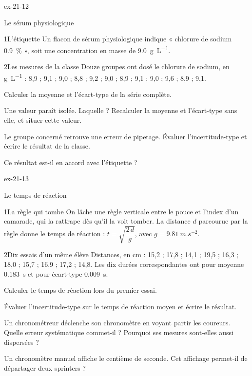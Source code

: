 \begin{blocLivre}{ex-21-12}
\begin{exercice}[3]{Le sérum physiologique}
\begin{docu}{1}{L'étiquette}
Un flacon de sérum physiologique indique « chlorure de sodium \qty{0,9}{\percent} », soit une concentration en masse de \qty{9,0}{g.L^{-1}}.
\end{docu}
\begin{docu}{2}{Les mesures de la classe}
Douze groupes ont dosé le chlorure de sodium, en \unit{g.L^{-1}} : 8,9 ; 9,1 ; 9,0 ; 8,8 ; 9,2 ; 9,0 ; 8,9 ; 9,1 ; 9,0 ; 9,6 ; 8,9 ; 9,1.
\end{docu}
\begin{questions}
\item Calculer la moyenne et l'écart-type de la série complète.
\item Une valeur paraît isolée. Laquelle ? Recalculer la moyenne et l'écart-type sans elle, et situer cette valeur.
\item \initiative Le groupe concerné retrouve une erreur de pipetage. Évaluer l'incertitude-type et écrire le résultat de la classe.
\item Ce résultat est-il en accord avec l'étiquette ?
\end{questions}
\end{exercice}
\end{blocLivre}
\begin{blocLivre}{ex-21-13}
\begin{exercice}[3]{Le temps de réaction}
\begin{docu}{1}{La règle qui tombe}
On lâche une règle verticale entre le pouce et l'index d'un camarade, qui la rattrape dès qu'il la voit tomber. La distance $d$
parcourue par la règle donne le temps de réaction : $t=\sqrt{\dfrac{2\,d}{g}}$, avec $g=\qty{9,81}{m.s^{-2}}$.
\end{docu}
\begin{docu}{2}{Dix essais d'un même élève}
Distances, en cm : 15,2 ; 17,8 ; 14,1 ; 19,5 ; 16,3 ; 18,0 ; 15,7 ; 16,9 ; 17,2 ; 14,8. Les dix durées correspondantes ont pour moyenne
\qty{0,183}{s} et pour écart-type \qty{0,009}{s}.
\end{docu}
\begin{questions}
\item Calculer le temps de réaction lors du premier essai.
\item Évaluer l'incertitude-type sur le temps de réaction moyen et écrire le résultat.
\item \initiative Un chronométreur déclenche son chronomètre en voyant partir les coureurs. Quelle erreur systématique commet-il ?
Pourquoi ses mesures sont-elles aussi dispersées ?
\item Un chronomètre manuel affiche le centième de seconde. Cet affichage permet-il de départager deux sprinters ?
\end{questions}
\end{exercice}
\end{blocLivre}
